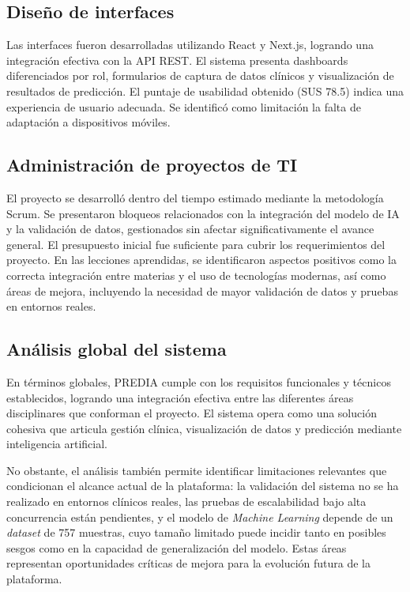 \documentclass[12pt, letterpaper, twoside]{report}
\begin{document}
\subsection{Diseño de interfaces}

Las interfaces fueron desarrolladas utilizando React y Next.js, logrando una integración efectiva con la API REST. El sistema presenta dashboards diferenciados por rol, formularios de captura de datos clínicos y visualización de resultados de predicción. El puntaje de usabilidad obtenido (SUS 78.5) indica una experiencia de usuario adecuada. Se identificó como limitación la falta de adaptación a dispositivos móviles.

\subsection{Administración de proyectos de TI}

El proyecto se desarrolló dentro del tiempo estimado mediante la metodología Scrum. Se presentaron bloqueos relacionados con la integración del modelo de IA y la validación de datos, gestionados sin afectar significativamente el avance general. El presupuesto inicial fue suficiente para cubrir los requerimientos del proyecto. En las lecciones aprendidas, se identificaron aspectos positivos como la correcta integración entre materias y el uso de tecnologías modernas, así como áreas de mejora, incluyendo la necesidad de mayor validación de datos y pruebas en entornos reales.

\subsection{Análisis global del sistema}

En términos globales, PREDIA cumple con los requisitos funcionales y técnicos establecidos, logrando una integración efectiva entre las diferentes áreas disciplinares que conforman el proyecto. El sistema opera como una solución cohesiva que articula gestión clínica, visualización de datos y predicción mediante inteligencia artificial.

No obstante, el análisis también permite identificar limitaciones relevantes que condicionan el alcance actual de la plataforma: la validación del sistema no se ha realizado en entornos clínicos reales, las pruebas de escalabilidad bajo alta concurrencia están pendientes, y el modelo de \textit{Machine Learning} depende de un \textit{dataset} de 757 muestras, cuyo tamaño limitado puede incidir tanto en posibles sesgos como en la capacidad de generalización del modelo. Estas áreas representan oportunidades críticas de mejora para la evolución futura de la plataforma.
\end{document}
